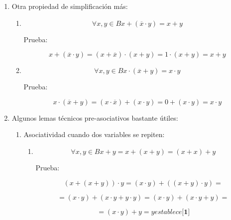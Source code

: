 \begin{enumerate}
\begin{enumerate}
\begin{enumerate}
\begin{enumerate}
\begin{enumerate}
          \[= {\left( {\left( {{x + y} + \overline{z}} \right) \cdot \left( {{x + \overline{y}} + \overline{z}} \right)} \right) \cdot \left( {\left( {{x + y} + z} \right) \cdot \left( {{\overline{x} + y} + z} \right)} \right)}\]

          \[= {\left( {x + \overline{z}} \right) \cdot \left( {y + z} \right)}\]
        \end{enumerate}
      \end{enumerate}
    \item
      Otra propiedad de simplificación más:

      \begin{enumerate}
      \def\labelenumiv{\arabic{enumiv}.}
      \item
        \[\forall x,{y \in B}{{x + {({\overline{x} \cdot y})}} = {x + y}}\]

        Prueba:

        \[{{{x + {({\overline{x} \cdot y})}} = {{({x + \overline{x}})} \cdot {({x + y})}}} = {1 \cdot {({x + y})}}} = {x + y}\]
      \item
        \[\forall x,{y \in B}{{x \cdot {({\overline{x} + y})}} = {x \cdot y}}\]

        Prueba:

        \[{{{x \cdot {({\overline{x} + y})}} = {{({x \cdot \overline{x}})} + {({x \cdot y})}}} = {0 + {({x \cdot y})}}} = {x \cdot y}\]
      \end{enumerate}
    \item
      Algunos lemas técnicos pre-asociativos bastante útiles:

      \begin{enumerate}
      \def\labelenumiv{\arabic{enumiv}.}
      \item
        Asociatividad cuando dos variables se repiten:

        \begin{enumerate}
        \def\labelenumv{\arabic{enumv}.}
        \item
          \[\forall x,{y \in B}{{{x + y} = {x + {({x + y})}}} = {{({x + x})} + y}}\]

          Prueba:

          \[{}{}{{{{({x + {({x + y})}})} \cdot y} = {{({x \cdot y})} + {({{({x + y})} \cdot y})}}} =}\]

          \[{}{{{= {{({x \cdot y})} + {({{x \cdot y} + {y \cdot y}})}}} = {{({x \cdot y})} + {({{x \cdot y} + y})}}} =}\]

          \[{}{{= {{({x \cdot y})} + y}} = y}{}{}{}\mathit{establece}{\lbrack\mathbf{1}\rbrack}\]


\end{enumerate}
\end{enumerate}
\end{enumerate}
\end{enumerate}
\end{enumerate}

